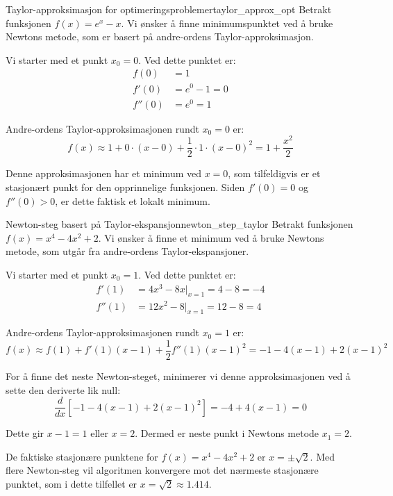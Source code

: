 \begin{example}{Taylor-approksimasjon for optimeringsproblemer}{taylor_approx_opt}
	Betrakt funksjonen $f(x) = e^x - x$. Vi ønsker å finne minimumspunktet ved å bruke Newtons metode, som er basert på andre-ordens Taylor-approksimasjon.

	Vi starter med et punkt $x_0 = 0$. Ved dette punktet er:
	\begin{align*}
		f(0)   & = 1           \\
		f'(0)  & = e^0 - 1 = 0 \\
		f''(0) & = e^0 = 1
	\end{align*}

	Andre-ordens Taylor-approksimasjonen rundt $x_0 = 0$ er:
	\[
		f(x) \approx 1 + 0 \cdot (x-0) + \frac{1}{2} \cdot 1 \cdot (x-0)^2 = 1 + \frac{x^2}{2}
	\]

	Denne approksimasjonen har et minimum ved $x = 0$, som tilfeldigvis er et stasjonært punkt for den opprinnelige funksjonen. Siden $f'(0) = 0$ og $f''(0) > 0$, er dette faktisk et lokalt minimum.
\end{example}

\begin{example}{Newton-steg basert på Taylor-ekspansjon}{newton_step_taylor}
	Betrakt funksjonen $f(x) = x^4 - 4x^2 + 2$. Vi ønsker å finne et minimum ved å bruke Newtons metode, som utgår fra andre-ordens Taylor-ekspansjoner.

	Vi starter med et punkt $x_0 = 1$. Ved dette punktet er:
	\begin{align*}
		f'(1)  & = 4x^3 - 8x|_{x=1} = 4 - 8 = -4 \\
		f''(1) & = 12x^2 - 8|_{x=1} = 12 - 8 = 4
	\end{align*}

	Andre-ordens Taylor-approksimasjonen rundt $x_0 = 1$ er:
	\[
		f(x) \approx f(1) + f'(1)(x-1) + \frac{1}{2}f''(1)(x-1)^2 = -1 - 4(x-1) + 2(x-1)^2
	\]

	For å finne det neste Newton-steget, minimerer vi denne approksimasjonen ved å sette den deriverte lik null:
	\[
		\frac{d}{dx}[-1 - 4(x-1) + 2(x-1)^2] = -4 + 4(x-1) = 0
	\]

	Dette gir $x-1 = 1$ eller $x = 2$. Dermed er neste punkt i Newtons metode $x_1 = 2$.

	De faktiske stasjonære punktene for $f(x) = x^4 - 4x^2 + 2$ er $x = \pm \sqrt{2}$. Med flere Newton-steg vil algoritmen konvergere mot det nærmeste stasjonære punktet, som i dette tilfellet er $x = \sqrt{2} \approx 1.414$.
\end{example}

